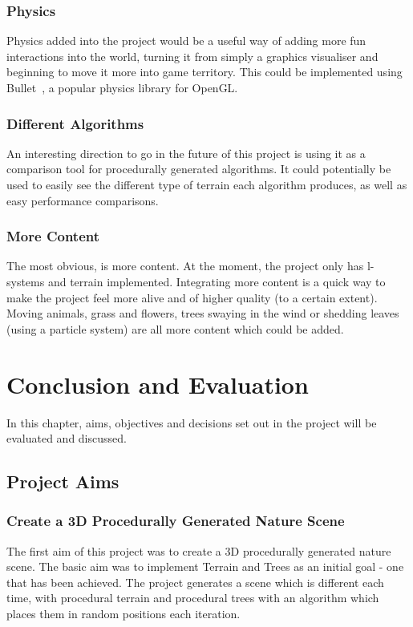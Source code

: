 \documentclass[a4paper,10pt]{report}
\begin{document}
\subsection{Physics}

Physics added into the project would be a useful way of adding more fun interactions into the world, turning it from simply a graphics visualiser and beginning to move it more into game territory. This could be implemented using Bullet~\cite{coumans2013bullet}, a popular physics library for OpenGL. 

\subsection{Different Algorithms}
An interesting direction to go in the future of this project is using it as a comparison tool for procedurally generated algorithms. It could potentially be used to easily see the different type of terrain each algorithm produces, as well as easy performance comparisons. 

\subsection{More Content}
The  most obvious, is more content. At the moment, the project only has l-systems and terrain implemented. Integrating more content is a quick way to make the project feel more alive and of higher quality (to a certain extent). Moving animals, grass and flowers, trees swaying in the wind or shedding leaves (using a particle system) are all more content which could be added.

\chapter{Conclusion and Evaluation}
In this chapter, aims, objectives and decisions set out in the project will be evaluated and discussed. 

\section{Project Aims}
\subsection{Create a 3D Procedurally Generated Nature Scene}
The first aim of this project was to create a 3D procedurally generated nature scene. The basic aim was to implement Terrain and Trees as an initial goal - one that has been achieved. The project generates a scene which is different each time, with procedural terrain and procedural trees with an algorithm which places them in random positions each iteration. \medskip
\end{document}
